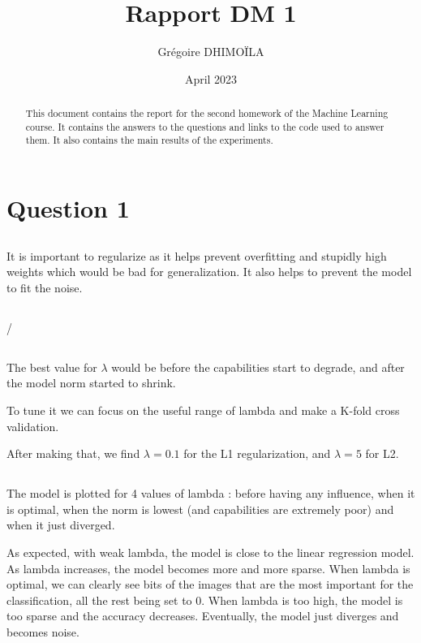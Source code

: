 \documentclass{article}
\title{Rapport DM 1}
\author{Grégoire DHIMOÏLA}
\date{April 2023}
\begin{document}
\maketitle

\begin{abstract}
    This document contains the report for the second homework of the Machine Learning course. It contains the answers to the questions and links to the code used to answer them. It also contains the main results of the experiments.
\end{abstract}

\section{Question 1}

\subsection{}
It is important to regularize as it helps prevent overfitting and stupidly high weights which would be bad for generalization. It also helps to prevent the model to fit the noise.

\subsection{} /

\subsection{}

The best value for $\lambda$ would be before the capabilities start to degrade, and after the model norm started to shrink.

To tune it we can focus on the useful range of lambda and make a K-fold cross validation.

After making that, we find $\lambda = 0.1$ for the L1 regularization, and $\lambda = 5$ for L2.

\subsection{}

The model is plotted for 4 values of lambda : before having any influence, when it is optimal, when the norm is lowest (and capabilities are extremely poor) and when it just diverged.

 As expected, with weak lambda, the model is close to the linear regression model.
As lambda increases, the model becomes more and more sparse. When lambda is optimal, we can clearly see bits of the images that are the most important for the classification, all the rest being set to 0.
When lambda is too high, the model is too sparse and the accuracy decreases. Eventually, the model just diverges and becomes noise.
\end{document}
